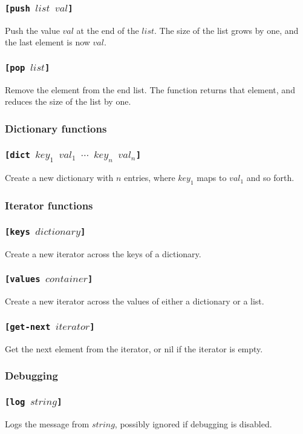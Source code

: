 \documentclass[11pt]{report}
\begin{document}
\subsubsection*{\tt{[push }$list$ $val$\tt{]}}
Push the value $val$ at the end of the $list$. The size of the list grows by one, and the last element is now $val$.

\subsubsection*{\tt{[pop }$list$\tt{]}}
Remove the element from the end list. The function returns that element, and reduces the size of the list by one.

\subsubsection{Dictionary functions}
\subsubsection*{\tt{[dict }$key_1$  $val_1$ $\cdots$ $key_n$ $val_n$\tt{]}}
Create a new dictionary with $n$ entries, where $key_1$ maps to $val_1$ and so forth.

\subsubsection{Iterator functions}
\subsubsection*{\tt{[keys }$dictionary$\tt{]}}
Create a new iterator across the keys of a dictionary.
\subsubsection*{\tt{[values }$container$\tt{]}}
Create a new iterator across the values of either a dictionary or a list.
\subsubsection*{\tt{[get-next }$iterator$\tt{]}}
Get the next element from the iterator, or nil if the iterator is empty.

\subsubsection{Debugging}
\subsubsection*{\tt{[log }$string$\tt{]}}
Logs the message from $string$, possibly ignored if debugging is disabled.
\end{document}
